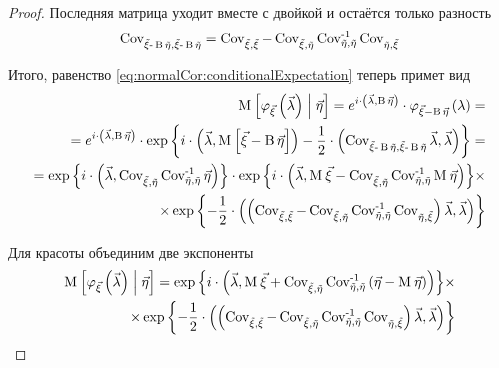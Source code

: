 \begin{proof}
    Последняя матрица уходит вместе с двойкой и остаётся только разность
    \begin{align*}
        \dCov{\vec{\xi} - \operatorname{B} \vec{\eta}}
        = \dCov{\vec{\xi}} - \Cov{\vec{\xi}}{\vec{\eta}}
            \dCov[-1]{\vec{\eta}} \Cov{\vec{\eta}}{\vec{\xi}}
    \end{align*}

    Итого, равенство \ref{eq:normalCor:conditionalExpectation} теперь примет вид
    \begin{align*}
        \Mean{\varphi_{\vec{\xi}}\left( \vec{\lambda} \right) \mcond \vec{\eta}}
        = e^{i \cdot \left( \vec{\lambda}, \operatorname{B} \vec{\eta} \right)}
            \cdot \varphi_{\vec{\xi} - \operatorname{B} \vec{\eta}}\left(
                \lambda \right) = \\
        = e^{i \cdot \left( \vec{\lambda}, \operatorname{B} \vec{\eta} \right)}
            \cdot \exp{\left\{ 
                        i \cdot \left( \vec{\lambda},
                        \Mean{\vec{\xi} - \operatorname{B} \vec{\eta}} \right)
                        - \frac{1}{2} \cdot \left( \dCov{\vec{\xi}
                            - \operatorname{B} \vec{\eta}} \vec{\lambda},
                            \vec{\lambda} \right)
                    \right\}} = \\
        = \exp{\left\{i \cdot \left( \vec{\lambda}, \Cov{\vec{\xi}}{\vec{\eta}}
                \dCov[-1]{\vec{\eta}} \vec{\eta} \right)\right\}}
            \cdot \exp{\left\{ 
                        i \cdot \left( \vec{\lambda},
                            \mean{\vec{\xi}} - \Cov{\vec{\xi}}{\vec{\eta}}
                                \dCov[-1]{\vec{\eta}} \mean{\vec{\eta}} \right)
                    \right\}} \times \\
            \times \exp{\left\{ - \frac{1}{2} \cdot \left(
                        \left( \dCov{\vec{\xi}} - \Cov{\vec{\xi}}{\vec{\eta}}
                            \dCov[-1]{\vec{\eta}} \Cov{\vec{\eta}}{\vec{\xi}}
                                \right) \vec{\lambda},
                        \vec{\lambda} \right) \right\}}
    \end{align*}

    Для красоты объединим две экспоненты
    \begin{align*}
        \Mean{\varphi_{\vec{\xi}}\left( \vec{\lambda} \right) \mcond \vec{\eta}}
        = \exp{\left\{i \cdot \left( \vec{\lambda},
                    \mean{\vec{\xi}} + \Cov{\vec{\xi}}{\vec{\eta}}
                        \dCov[-1]{\vec{\eta}} \left(
                            \vec{\eta} - \mean{\vec{\eta}} \right) \right)
                \right\}} \times \\
            \times \exp{\left\{- \frac{1}{2} \cdot \left(
                        \left( \dCov{\vec{\xi}} - \Cov{\vec{\xi}}{\vec{\eta}}
                            \dCov[-1]{\vec{\eta}} \Cov{\vec{\eta}}{\vec{\xi}}
                                \right) \vec{\lambda},
                        \vec{\lambda} \right)\right\}}
    \end{align*}


\end{proof}
